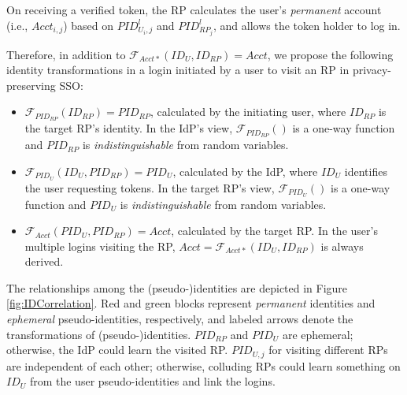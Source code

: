 On receiving a verified token, the RP calculates the user's \emph{permanent} account (i.e., $Acct_{i,j}$) based on $PID^l_{U_i,j}$ and $PID^l_{RP_j}$,
and allows the token holder to log in.

Therefore, in addition to $\mathcal{F}_{Acct\ast}(ID_{U}, ID_{RP}) = Acct$,
we propose the following identity transformations in a login initiated by a user to visit an RP in privacy-preserving SSO:
\begin{itemize}
\setlength{\topsep}{0pt}
\setlength{\partopsep}{0pt}
\setlength{\itemsep}{0pt}
\setlength{\parsep}{0pt}
\setlength{\parskip}{0pt}

\item
$\mathcal{F}_{PID_{RP}}(ID_{RP}) = PID_{RP}$, calculated by the initiating user,
    where $ID_{RP}$ is the target RP's identity.
In the IdP's view,
$\mathcal{F}_{PID_{RP}}()$ is a one-way function and $PID_{RP}$
is \emph{indistinguishable} from random variables.
\item
$\mathcal{F}_{PID_U}(ID_U, PID_{RP}) = PID_{U}$, calculated by the IdP,
    where $ID_U$ identifies the user requesting tokens.
In the target RP's view,
    $\mathcal{F}_{PID_U}()$ is a one-way function and $PID_{U}$ is \emph{indistinguishable} from random variables.
\item
$\mathcal{F}_{Acct}(PID_{U}, PID_{RP}) = Acct$, calculated by the target RP.
In the user's multiple logins visiting the RP,
    $Acct = \mathcal{F}_{Acct\ast}(ID_{U}, ID_{RP})$ is always derived.
\end{itemize}

The relationships among the (pseudo-)identities are depicted in Figure \ref{fig:IDCorrelation}.
Red and green blocks represent \emph{permanent} identities and \emph{ephemeral} pseudo-identities, respectively, and 
labeled arrows denote the transformations of (pseudo-)identities.
$PID_{RP}$ and $PID_{U}$ are ephemeral;
    otherwise, the IdP could learn the visited RP.
$PID_{U,j}$ for visiting different RPs are independent of each other;
    otherwise, colluding RPs could learn something on $ID_U$ from the user pseudo-identities and link the logins.

